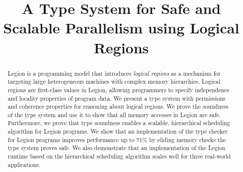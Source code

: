 \documentclass[9pt,nocopyrightspace,preprint]{sigplanconf}
\begin{document}
\title{A Type System for Safe and Scalable Parallelism using Logical Regions}
\maketitle

\begin{abstract}

Legion is a programming model that introduces 
{\em logical regions} as a mechanism for targeting large heterogeneous machines 
with complex memory hierarchies.  Logical regions are first-class 
values in Legion, allowing programmers to specify independence 
and locality properties of program data.  We present
a type system with permissions and coherence properties for reasoning about logical regions.  
We prove the soundness of the type system and use it to show
that all memory accesses in Legion are safe.  Furthermore, we prove that
type soundness enables a scalable, hierarchical
scheduling algorithm for Legion programs.  We show that an implementation of the type checker
for Legion programs improves performance up to 71\% by eliding
memory checks the type system proves safe.  We also demonstrate that an implementation of the Legion 
runtime based on the hierarchical scheduling algorithm scales well for
three real-world applications.



\end{abstract}



%









{
\small

}
\end{document}
